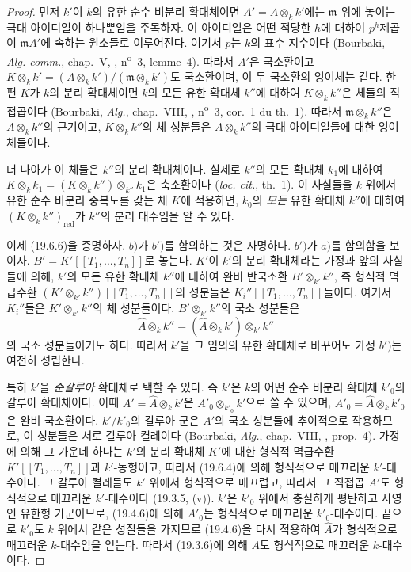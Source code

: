 \begin{proof}
먼저 $k'$이 $k$의 유한 순수 비분리 확대체이면
$A'=A\otimes_k k'$에는 $\mathfrak m$ 위에 놓이는 극대 아이디얼이
하나뿐임을 주목하자. 이 아이디얼은 어떤 적당한 $h$에 대하여
$p^h$제곱이 $\mathfrak m A'$에 속하는 원소들로 이루어진다. 여기서
$p$는 $k$의 표수 지수이다 (Bourbaki, \emph{Alg. comm.}, chap.~V,
, n\textsuperscript{o}~3, lemme~4). 따라서 $A'$은
국소환이고
$K\otimes_k k'=(A\otimes_k k')/(\mathfrak m\otimes_k k')$도
국소환이며, 이 두 국소환의 잉여체는 같다. 한편 $K$가 $k$의 분리
확대체이면 $k$의 모든 유한 확대체 $k''$에 대하여
$K\otimes_k k''$은 체들의 직접곱이다 (Bourbaki, \emph{Alg.},
chap.~VIII, , n\textsuperscript{o}~3, cor.~1 du th.~1).
따라서 $\mathfrak m\otimes_k k''$은 $A\otimes_k k''$의 근기이고,
$K\otimes_k k''$의 체 성분들은 $A\otimes_k k''$의 극대 아이디얼들에
대한 잉여체들이다.


더 나아가 이 체들은 $k''$의 분리 확대체이다. 실제로 $k''$의 모든
확대체 $k_1$에 대하여
$K\otimes_k k_1=(K\otimes_k k'')\otimes_{k''}k_1$은 축소환이다
(\emph{loc. cit.}, th.~1). 이 사실들을 $k$ 위에서 유한 순수 비분리
중복도를 갖는 체 $K$에 적용하면, $k_0$의 \emph{모든} 유한 확대체
$k''$에 대하여 $(K\otimes_k k'')_{\mathrm{red}}$가 $k''$의 분리
대수임을 알 수 있다.

이제 (19.6.6)을 증명하자. $b)$가 $b')$를 함의하는 것은 자명하다.
$b')$가 $a)$를 함의함을 보이자. $B'=K'[[T_1,\ldots,T_n]]$로 놓는다.
$K'$이 $k'$의 분리 확대체라는 가정과 앞의 사실들에 의해, $k'$의
모든 유한 확대체 $k''$에 대하여 완비 반국소환
$B'\otimes_{k'}k''$, 즉 형식적 멱급수환
$(K'\otimes_{k'}k'')[[T_1,\ldots,T_n]]$의 성분들은
$K_i''[[T_1,\ldots,T_n]]$들이다. 여기서 $K_i''$들은
$K'\otimes_{k'}k''$의 체 성분들이다. $B'\otimes_{k'}k''$의 국소
성분들은
\[
  \widehat A\otimes_k k''
  =(\widehat A\otimes_k k')\otimes_{k'}k''
\]
의 국소 성분들이기도 하다. 따라서 $k'$을 그 임의의 유한 확대체로
바꾸어도 가정 $b')$는 여전히 성립한다.

특히 $k'$을 \emph{준갈루아} 확대체로 택할 수 있다. 즉 $k'$은 $k$의
어떤 순수 비분리 확대체 $k'_0$의 갈루아 확대체이다. 이때
$A'=\widehat A\otimes_k k'$은
$A'_0\otimes_{k'_0}k'$으로 쓸 수 있으며,
$A'_0=\widehat A\otimes_k k'_0$은 완비 국소환이다. $k'/k'_0$의
갈루아 군은 $A'$의 국소 성분들에 추이적으로 작용하므로, 이 성분들은
서로 갈루아 켤레이다 (Bourbaki, \emph{Alg.}, chap.~VIII,
, prop.~4). 가정에 의해 그 가운데 하나는 $k'$의 분리
확대체 $K'$에 대한 형식적 멱급수환 $K'[[T_1,\ldots,T_n]]$과
$k'$-동형이고, 따라서 (19.6.4)에 의해 형식적으로 매끄러운
$k'$-대수이다. 그 갈루아 켤레들도 $k'$ 위에서 형식적으로 매끄럽고,
따라서 그 직접곱 $A'$도 형식적으로 매끄러운 $k'$-대수이다
(19.3.5, (v)). $k'$은 $k'_0$ 위에서 충실하게 평탄하고 사영인 유한형
가군이므로, (19.4.6)에 의해 $A'_0$는 형식적으로 매끄러운
$k'_0$-대수이다. 끝으로 $k'_0$도 $k$ 위에서 같은 성질들을 가지므로
(19.4.6)을 다시 적용하여 $\widehat A$가 형식적으로 매끄러운
$k$-대수임을 얻는다. 따라서 (19.3.6)에 의해 $A$도 형식적으로
매끄러운 $k$-대수이다.


\end{proof}
